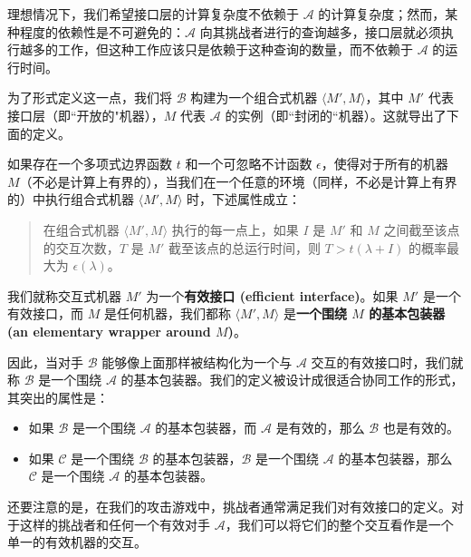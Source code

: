 理想情况下，我们希望接口层的计算复杂度不依赖于 $\mathcal{A}$ 的计算复杂度；然而，某种程度的依赖性是不可避免的：$\mathcal{A}$ 向其挑战者进行的查询越多，接口层就必须执行越多的工作，但这种工作应该只是依赖于这种查询的数量，而不依赖于 $\mathcal{A}$ 的运行时间。

为了形式定义这一点，我们将 $\mathcal{B}$ 构建为一个组合式机器 $\langle M',M\rangle$，其中 $M'$ 代表接口层（即``开放的"机器），$M$ 代表 $\mathcal{A}$ 的实例（即``封闭的“机器）。这就导出了下面的定义。

\begin{definition}[基本包装器]\label{def:2-12}
如果存在一个多项式边界函数 $t$ 和一个可忽略不计函数 $\epsilon$，使得对于所有的机器 $M$（不必是计算上有界的），当我们在一个任意的环境（同样，不必是计算上有界的）中执行组合式机器 $\langle M',M\rangle$ 时，下述属性成立：
\begin{quote}
在组合式机器 $\langle M',M\rangle$ 执行的每一点上，如果 $I$ 是 $M'$ 和 $M$ 之间截至该点的交互次数，$T$ 是 $M'$ 截至该点的总运行时间，则 $T>t(\lambda+I)$ 的概率最大为 $\epsilon(λ)$。
\end{quote}
我们就称交互式机器 $M'$ 为一个\textbf{有效接口 (efficient interface)}。如果 $M'$ 是一个有效接口，而 $M$ 是任何机器，我们都称 $\langle M',M\rangle$ 是\textbf{一个围绕 $M$ 的基本包装器 (an elementary wrapper around $M$)}。
\end{definition}

因此，当对手 $\mathcal{B}$ 能够像上面那样被结构化为一个与 $\mathcal{A}$ 交互的有效接口时，我们就称 $\mathcal{B}$ 是一个围绕 $\mathcal{A}$ 的基本包装器。我们的定义被设计成很适合协同工作的形式，其突出的属性是：
\begin{itemize}
	\item 如果 $\mathcal{B}$ 是一个围绕 $\mathcal{A}$ 的基本包装器，而 $\mathcal{A}$ 是有效的，那么 $\mathcal{B}$ 也是有效的。
	\item 如果 $\mathcal{C}$ 是一个围绕 $\mathcal{B}$ 的基本包装器，$\mathcal{B}$ 是一个围绕 $\mathcal{A}$ 的基本包装器，那么 $\mathcal{C}$ 是一个围绕 $\mathcal{A}$ 的基本包装器。
\end{itemize}

还要注意的是，在我们的攻击游戏中，挑战者通常满足我们对有效接口的定义。对于这样的挑战者和任何一个有效对手 $\mathcal{A}$，我们可以将它们的整个交互看作是一个单一的有效机器的交互。

